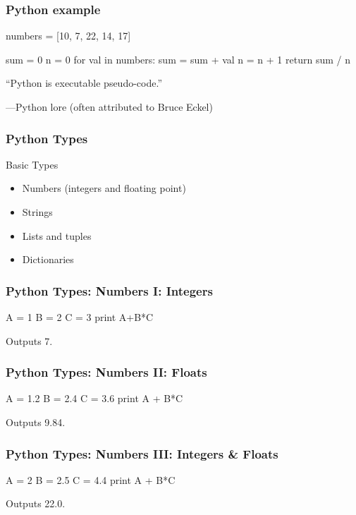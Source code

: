 \begin{frame}[fragile]
\frametitle{Python example}

\begin{python}
numbers = [10, 7, 22, 14, 17]

sum = 0
n = 0
for val in numbers:
    sum = sum + val
    n = n + 1
return sum / n
\end{python}

\end{frame}

\begin{frame}[fragile]
``Python is executable pseudo-code.''

---Python lore (often attributed to Bruce Eckel)

\end{frame}



\begin{frame}[fragile]
\frametitle{Python Types}
\begin{block}{Basic Types}
\begin{itemize}
\item Numbers (integers and floating point)
\item Strings
\item Lists and tuples
\item Dictionaries
\end{itemize}
\end{block}
\end{frame}


\begin{frame}[fragile]
\frametitle{Python Types: Numbers I: Integers}
\begin{python}
A = 1
B = 2
C = 3
print A+B*C
\end{python}

Outputs \alert{7}.
\end{frame}

\begin{frame}[fragile]
\frametitle{Python Types: Numbers II: Floats}
\begin{python}
A = 1.2
B = 2.4
C = 3.6
print A + B*C
\end{python}

Outputs \alert{9.84}.
\end{frame}

\begin{frame}[fragile]
\frametitle{Python Types: Numbers III: Integers \& Floats}
\begin{python}
A = 2
B = 2.5
C = 4.4
print A + B*C
\end{python}

Outputs \alert{22.0}.
\end{frame}

